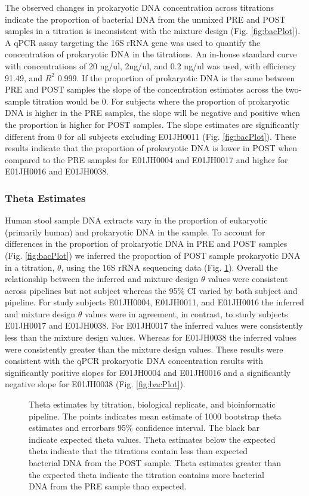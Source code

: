 \documentclass{bmcart}
\def\texttt{[image: ]}
\begin{document}
The observed changes in prokaryotic DNA concentration across titrations
indicate the proportion of bacterial DNA from the unmixed PRE and POST
samples in a titration is inconsistent with the mixture design (Fig.
\ref{fig:bacPlot}). A qPCR assay targeting the 16S rRNA gene was used to
quantify the concentration of prokaryotic DNA in the titrations. An
in-house standard curve with concentrations of 20 ng/ul, 2ng/ul, and 0.2
ng/ul was used, with efficiency 91.49, and \(R^2\) 0.999. If the
proportion of prokaryotic DNA is the same between PRE and POST samples
the slope of the concentration estimates across the two-sample titration
would be 0. For subjects where the proportion of prokaryotic DNA is
higher in the PRE samples, the slope will be negative and positive when
the proportion is higher for POST samples. The slope estimates are
significantly different from 0 for all subjects excluding E01JH0011
(Fig. \ref{fig:bacPlot}). These results indicate that the proportion of
prokaryotic DNA is lower in POST when compared to the PRE samples for
E01JH0004 and E01JH0017 and higher for E01JH0016 and E01JH0038.

\subsubsection*{Theta Estimates}

Human stool sample DNA extracts vary in the proportion of eukaryotic
(primarily human) and prokaryotic DNA in the sample. To account for
differences in the proportion of prokaryotic DNA in PRE and POST samples
(Fig. \ref{fig:bacPlot}) we inferred the proportion of POST sample
prokaryotic DNA in a titration, \(\theta\), using the 16S rRNA
sequencing data (Fig. \ref{fig:thetaHat}). Overall the relationship
between the inferred and mixture design \(\theta\) values were
consistent across pipelines but not subject whereas the 95\% CI varied
by both subject and pipeline. For study subjects E01JH0004, E01JH0011,
and E01JH0016 the inferred and mixture design \(\theta\) values were in
agreement, in contrast, to study subjects E01JH0017 and E01JH0038. For
E01JH0017 the inferred values were consistently less than the mixture
design values. Whereas for E01JH0038 the inferred values were
consistently greater than the mixture design values. These results were
consistent with the qPCR prokaryotic DNA concentration results with
significantly positive slopes for E01JH0004 and E01JH0016 and a
significantly negative slope for E01JH0038 (Fig. \ref{fig:bacPlot}).

\begin{figure}
\centering
\texttt{[image: springerAbundanceFiles/figure-latex/thetaHat-1.pdf]}
\caption{\label{fig:thetaHat}Theta estimates by titration, biological
replicate, and bioinformatic pipeline. The points indicates mean
estimate of 1000 bootstrap theta estimates and errorbars 95\% confidence
interval. The black bar indicate expected theta values. Theta estimates
below the expected theta indicate that the titrations contain less than
expected bacterial DNA from the POST sample. Theta estimates greater
than the expected theta indicate the titration contains more bacterial
DNA from the PRE sample than expected.}
\end{figure}
\end{document}
